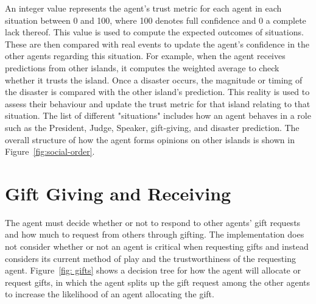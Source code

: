 An integer value represents the agent's trust metric for each agent in each situation between 0 and 100, where 100 denotes full confidence and 0 a complete lack thereof. This value is used to compute the expected outcomes of situations. These are then compared with real events to update the agent's confidence in the other agents regarding this situation. For example, when the agent receives predictions from other islands, it computes the weighted average to check whether it trusts the island. Once a disaster occurs, the magnitude or timing of the disaster is compared with the other island's prediction. This reality is used to assess their behaviour and update the trust metric for that island relating to that situation. The list of different "situations" includes how an agent behaves in a role such as the President, Judge, Speaker, gift-giving, and disaster prediction. The overall structure of how the agent forms opinions on other islands is shown in Figure~\ref{fig:social-order}.

\section{Gift Giving and Receiving}
The agent must decide whether or not to respond to other agents' gift requests and how much to request from others through gifting. The implementation does not consider whether or not an agent is critical when requesting gifts and instead considers its current method of play and the trustworthiness of the requesting agent. Figure~\ref{fig: gifts} shows a decision tree for how the agent will allocate or request gifts, in which the agent splits up the gift request among the other agents to increase the likelihood of an agent allocating the gift.


